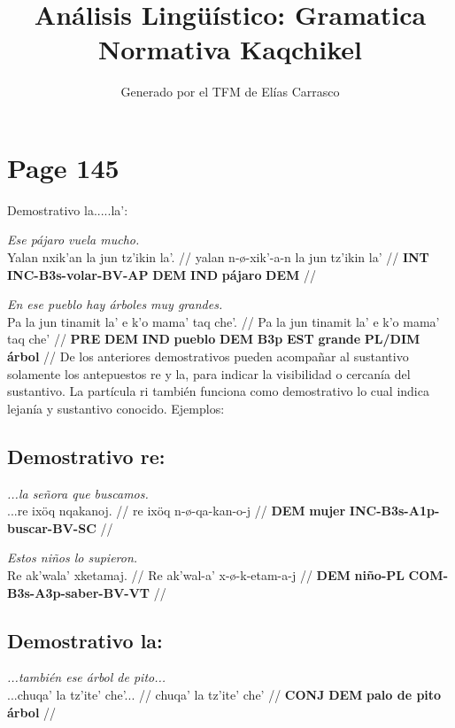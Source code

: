 \documentclass{article}%
\title{Análisis Lingüístico: Gramatica Normativa Kaqchikel}%
\author{Generado por el TFM de Elías Carrasco}%
\begin{document}
%
\normalsize%
\maketitle%
\section{Page 145}%
\label{sec:Page145}%
Demostrativo la.....la’: %
\par\medskip%
\ex
\textit{Ese pájaro vuela mucho.} \\
\begingl
\gla Yalan nxik’an la jun tz’ikin la’. //
\glb yalan n-ø-xik’-a-n la jun tz’ikin la’ //
\glc \textbf{INT} \textbf{INC-B3s-volar-BV-AP} \textbf{DEM} \textbf{IND} \textbf{pájaro} \textbf{DEM} //
\endgl
\xe
%
\medskip%
\par\medskip%
\ex
\textit{En ese pueblo hay árboles muy grandes.} \\
\begingl
\gla Pa la jun tinamit la’ e k’o mama’ taq che’. //
\glb Pa la jun tinamit la’ e k’o mama’ taq che’ //
\glc \textbf{PRE} \textbf{DEM} \textbf{IND} \textbf{pueblo} \textbf{DEM} \textbf{B3p} \textbf{EST} \textbf{grande} \textbf{PL/DIM} \textbf{árbol} //
\endgl
\xe
%
\medskip%
De los anteriores demostrativos pueden acompañar al sustantivo solamente los antepuestos re y la, para indicar la visibilidad o cercanía del sustantivo. La partícula ri también funciona como demostrativo lo cual indica lejanía y sustantivo conocido. %
Ejemplos: %
\subsection{Demostrativo re:}%
\label{subsec:Demostrativore}%

%
\par\medskip%
\ex
\textit{...la señora que buscamos.} \\
\begingl
\gla ...re ixöq nqakanoj. //
\glb re ixöq n-ø-qa-kan-o-j //
\glc \textbf{DEM} \textbf{mujer} \textbf{INC-B3s-A1p-buscar-BV-SC} //
\endgl
\xe
%
\medskip%
\par\medskip%
\ex
\textit{Estos niños lo supieron.} \\
\begingl
\gla Re ak’wala’ xketamaj. //
\glb Re ak’wal-a’ x-ø-k-etam-a-j //
\glc \textbf{DEM} \textbf{niño-PL} \textbf{COM-B3s-A3p-saber-BV-VT} //
\endgl
\xe
%
\medskip%
\subsection{Demostrativo la:}%
\label{subsec:Demostrativola}%

%
\par\medskip%
\ex
\textit{...también ese árbol de pito...} \\
\begingl
\gla ...chuqa’ la tz’ite’ che’... //
\glb chuqa’ la tz’ite’ che’ //
\glc \textbf{CONJ} \textbf{DEM} \textbf{palo de pito} \textbf{árbol} //
\endgl
\xe
%
\medskip

%
\end{document}
